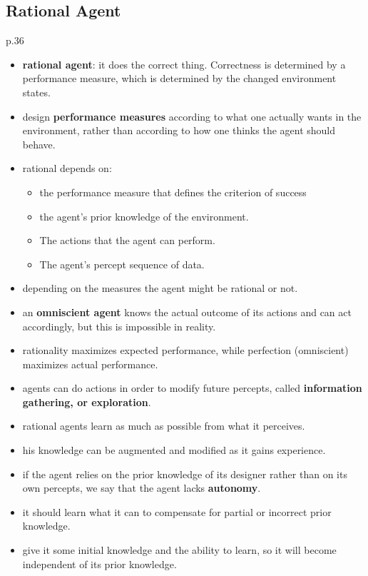 \subsection{Rational Agent}
p.36
\begin{itemize}[noitemsep,nolistsep]
	\item \textbf{rational agent}: it does the correct thing. Correctness is determined by a performance measure, which is determined by the changed environment states.
	\item design \textbf{performance measures} according to what one actually wants in the environment, rather than according to how one thinks the agent should behave.
	\item rational depends on:
	\begin{itemize}
		\item the performance measure that defines the criterion of success
		\item the agent’s prior knowledge of the environment.
		\item The actions that the agent can perform.
		\item The agent’s percept sequence of data.
	\end{itemize}
	\item depending on the measures the agent might be rational or not. 
	\item an \textbf{omniscient agent} knows the actual outcome of its actions and can act accordingly, but this is impossible in reality.
	\item rationality maximizes expected performance, while perfection (omniscient) maximizes actual performance.
	\item agents can do actions in order to modify future percepts, called \textbf{information gathering, or exploration}.
	\item rational agents learn as much as possible from what it perceives.
	\item his knowledge can be augmented and modified as it gains experience.
	\item if the agent relies on the prior knowledge of its designer rather than on its own percepts, we say that the agent lacks \textbf{autonomy}.
	\item it should learn what it can to compensate for partial or incorrect prior knowledge.
	\item give it some initial knowledge and the ability to learn, so it will become independent of its prior knowledge.
\end{itemize}

